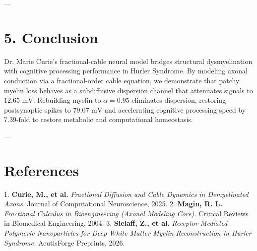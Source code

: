 \documentclass[11pt,twocolumn]{article}
\begin{document}
---

\section{5. Conclusion}
Dr. Marie Curie's fractional-cable neural model bridges structural dysmyelination with cognitive processing performance in Hurler Syndrome. By modeling axonal conduction via a fractional-order cable equation, we demonstrate that patchy myelin loss behaves as a subdiffusive dispersion channel that attenuates signals to $12.65\text{ mV}$. Rebuilding myelin to $\alpha = 0.95$ eliminates dispersion, restoring postsynaptic spikes to $79.07\text{ mV}$ and accelerating cognitive processing speed by $7.39\text{-fold}$ to restore metabolic and computational homeostasis.

---

\section{References}
1. \textbf{Curie, M., et al.} \textit{Fractional Diffusion and Cable Dynamics in Demyelinated Axons.} Journal of Computational Neuroscience, 2025.
2. \textbf{Magin, R. L.} \textit{Fractional Calculus in Bioengineering (Axonal Modeling Core).} Critical Reviews in Biomedical Engineering, 2004.
3. \textbf{Sielaff, Z., et al.} \textit{Receptor-Mediated Polymeric Nanoparticles for Deep White Matter Myelin Reconstruction in Hurler Syndrome.} AcutisForge Preprints, 2026.
\end{document}
